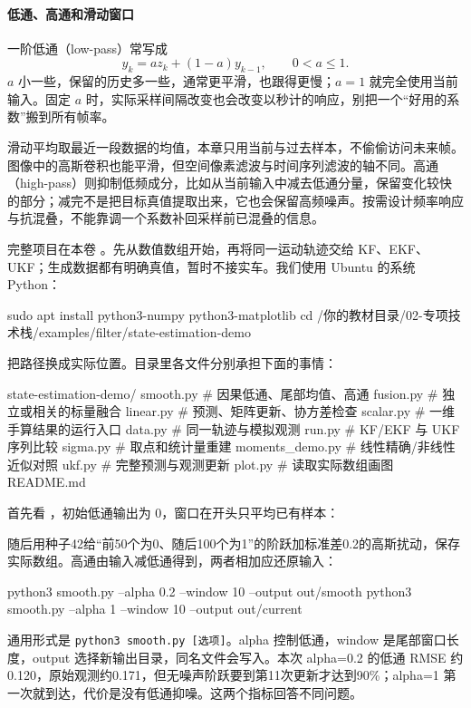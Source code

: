 \paragraph*{低通、高通和滑动窗口}
一阶低通（low-pass）常写成
\[
y_k=a z_k+(1-a)y_{k-1},\qquad 0<a\le1.
\]
$a$ 小一些，保留的历史多一些，通常更平滑，也跟得更慢；$a=1$ 就完全使用当前输入。固定 $a$ 时，实际采样间隔改变也会改变以秒计的响应，别把一个“好用的系数”搬到所有帧率。

滑动平均取最近一段数据的均值，本章只用当前与过去样本，不偷偷访问未来帧。图像中的高斯卷积也能平滑，但空间像素滤波与时间序列滤波的轴不同。高通（high-pass）则抑制低频成分，比如从当前输入中减去低通分量，保留变化较快的部分；减完不是把目标真值提取出来，它也会保留高频噪声。按需设计频率响应与抗混叠，不能靠调一个系数补回采样前已混叠的信息。

\begin{example}[给平滑加上可观察的输入]
完整项目在本卷 。先从数值数组开始，再将同一运动轨迹交给 KF、EKF、UKF；生成数据都有明确真值，暂时不接实车。我们使用 Ubuntu 的系统 Python：
\begin{tbash}
sudo apt install python3-numpy python3-matplotlib
cd /你的教材目录/02-专项技术栈/examples/filter/state-estimation-demo
\end{tbash}
把路径换成实际位置。目录里各文件分别承担下面的事情：
\begin{tbash}
state-estimation-demo/
  smooth.py         # 因果低通、尾部均值、高通
  fusion.py         # 独立或相关的标量融合
  linear.py         # 预测、矩阵更新、协方差检查
  scalar.py         # 一维手算结果的运行入口
  data.py           # 同一轨迹与模拟观测
  run.py            # KF/EKF 与 UKF 序列比较
  sigma.py          # 取点和统计量重建
  moments_demo.py   # 线性精确/非线性近似对照
  ukf.py            # 完整预测与观测更新
  plot.py           # 读取实际数组画图
  README.md
\end{tbash}
首先看 ，初始低通输出为 0，窗口在开头只平均已有样本：

随后用种子42给“前50个为0、随后100个为1”的阶跃加标准差0.2的高斯扰动，保存实际数组。高通由输入减低通得到，两者相加应还原输入：

\begin{tbash}
python3 smooth.py --alpha 0.2 --window 10 --output out/smooth
python3 smooth.py --alpha 1 --window 10 --output out/current
\end{tbash}
通用形式是 \texttt{python3 smooth.py [选项]}。alpha 控制低通，window 是尾部窗口长度，output 选择新输出目录，同名文件会写入。本次 alpha=0.2 的低通 RMSE 约0.120，原始观测约0.171，但无噪声阶跃要到第11次更新才达到90\%；alpha=1 第一次就到达，代价是没有低通抑噪。这两个指标回答不同问题。
\end{example}
